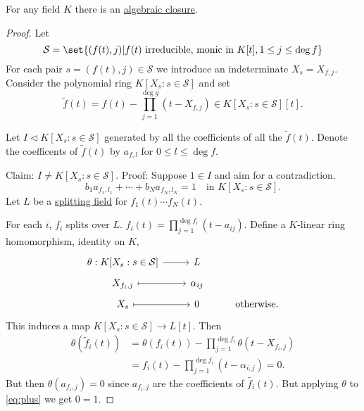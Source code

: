 \documentclass{article}
\begin{document}
\begin{nthm}\label{thm:5.7}
    For any field $K$ there is an \hyperlink{def:closure}{algebraic closure}.
\end{nthm}
\begin{proof}
    Let
    \begin{equation*}
        \mathcal{S} = \set{(f(t),j) | f(t) \text{ irreducible, monic in } K[t], 1 \leq j \leq \deg f}
    \end{equation*}
    For each pair $s = (f(t),j) \in \mathcal{S}$ we introduce an indeterminate $X_s = X_{f,j}$.
    Consider the polynomial ring $K[X_s: s \in \mathcal{S}]$ and set
    \begin{equation*}\tilde{f}(t) = f(t) - \prod_{j=1}^{\deg g} (t - X_{f,j}) \in K[X_s: s \in \mathcal{S}][t].\end{equation*}

    Let $I \lhd K[X_s : s \in \mathcal{S}]$ generated by all the coefficients of all the $\tilde{f}(t)$.
    Denote the coefficents of $\tilde{f}(t)$ by $a_{f,l}$ for $0 \leq l \leq \deg f$.

    Claim: $I \neq K[X_s : s \in \mathcal{S}]$.
    Proof: Suppose $1 \in I$ and aim for a contradiction.
    \begin{equation*}
        b_1 a_{f_1,l_1} + \dotsb + b_N a_{f_N,l_N} = 1 \quad \text{in } K[X_s : s \in \mathcal{S}]. \tag{$+$} \label{eq:plus}
    \end{equation*}
    Let $L$ be a \hyperlink{def:splitting}{splitting field} for $f_1(t) \dotsm f_N(t)$.

    For each $i$, $f_i$ splits over $L$. $f_i(t) = \prod_{j=1}^{\deg f_i} (t-a_{ij})$.
    Define a $K$-linear ring homomorphism, identity on $K$,
    \begin{equation*}
        \begin{tikzcd}[row sep=tiny]
            \theta: K[X_s : s \in \mathcal{S}] \rar & L \\
            X_{f_i,j} \rar[maps to] & \alpha_{ij} \\
            X_s \rar[maps to] & 0 & \text{otherwise}.
        \end{tikzcd}
    \end{equation*}
    This induces a map $K[X_s : s \in \mathcal{S}] \to L[t]$.
    Then
    \begin{align*}
        \theta(\tilde{f}_i(t)) &= \theta(f_i(t)) - \prod_{j=1}^{\deg f_i} \theta(t - X_{f_i,j}) \\
                               &= f_i(t) - \prod_{j=1}^{\deg f_i} (t - \alpha_{i,j}) = 0.
    \end{align*}
    But then $\theta(a_{f_i,j}) = 0$ since $a_{f_i,j}$ are the coefficients of $\tilde{f_i}(t)$.
    But applying $\theta$ to \eqref{eq:plus} we get $0=1$.


\end{proof}
\end{document}
